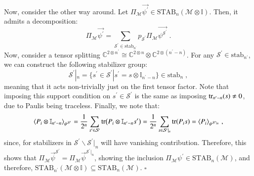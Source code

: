 \documentclass[10pt,aps,pra,twocolumn,floatfix,nofootinbib,superscriptaddress,longbibliography]{revtex4-2}
\newcommand{\1}{\mathbbm{1}}
\begin{document}
Now, consider the other way around. Let $\Pi_\mathcal M \vec{\psi^\prime} \in \mathrm{STAB}_n(\mathcal M \otimes 
 \mathbb I)$. Then, it admits a decomposition:
 \begin{equation}
     \Pi_\mathcal M \vec{\psi^\prime} =\sum_{\mathcal S^\prime \in \mathrm{stab}_{n^\prime}} p_{\mathcal S^\prime} \Pi_\mathcal M\vec{\psi^{\mathcal S^\prime}}\;.
 \end{equation}
Now, consider a tensor splitting $\mathbb C^{2\otimes n^\prime} \cong \mathbb C^{2\otimes n}\otimes \mathbb C^{2\otimes (n^\prime-n)}$. For any $\mathcal S^\prime \in \mathrm{stab}_{n^\prime}$, we can construct the following stabilizer group:
\begin{equation}
    \mathcal S^\prime|_{n} = \{s^\prime \in \mathcal S^\prime |s^\prime =s \otimes \mathbb I_{n^\prime-n}\} \in \mathrm{stab}_n\;,
\end{equation}
meaning that it acts non-trivially just on the first tensor factor. Note that imposing this support condition on $s^\prime \in \mathcal S^\prime$ is the same as imposing $\tr_{n^\prime-n}(s) \neq 0$, due to Paulis being traceless. Finally, we note that:
\begin{equation}
    \langle P_i \otimes \mathbb I_{n^\prime-n}\rangle_{\psi^{\mathcal S^\prime}} = \frac{1}{2^n}\sum_{s^\prime \in \mathcal S^\prime} \tr(P_i \otimes \mathbb I_{n^\prime-n}s^\prime) = \frac{1}{2^n}\sum_{s \in \mathcal S^\prime|_n} \tr(P_i s) =\langle P_i \rangle_{\psi^{\mathcal S^\prime|_n}}\;,
\end{equation}
since, for stabilizers in $\mathcal S^\prime \backslash \mathcal S^\prime|_{n}$ will have vanishing contribution. Therefore, this shows that $\Pi_{\mathcal M} \vec{\psi}^{\mathcal S^\prime} = \Pi_{\mathcal M} \vec{\psi}^{\mathcal S^\prime|_n}$, showing the inclusion $\Pi_\mathcal M \psi^\prime \in \mathrm{STAB}_n(\mathcal M)$, and therefore, $\mathrm{STAB}_{n^\prime}(\mathcal M \otimes \mathbb I)\subseteq \mathrm{STAB}_n(\mathcal M)$. $\square$
\end{document}

